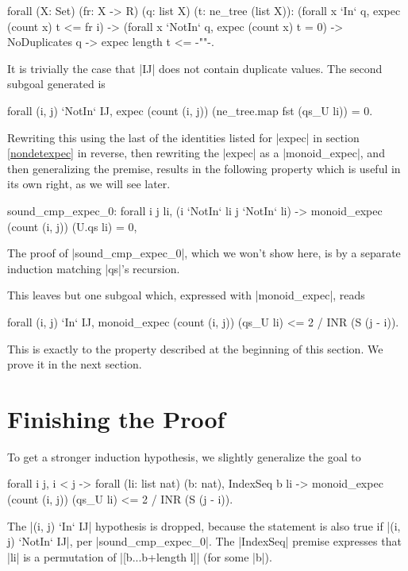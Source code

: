 \documentclass[runningheads]{llncs}
\begin{document}
\parbox{\textwidth}{\begin{code}
  forall (X: Set) (fr: X -> R) (q: list X) (t: ne_tree (list X)):
    (forall x `In` q, expec (count x) t <= fr i) ->
    (forall x `NotIn` q, expec (count x) t = 0) ->
    NoDuplicates q -> expec length t <= {-""-}.
\end{code}}
It is trivially the case that |IJ| does not contain duplicate values. The second subgoal generated is\begin{code}forall (i, j) `NotIn` IJ, expec (count (i, j)) (ne_tree.map fst (qs_U li)) = 0.\end{code} Rewriting this using  the last of the identities listed for |expec| in section \ref{nondetexpec} in reverse, then rewriting the |expec| as a |monoid_expec|, and then generalizing the premise, results in the following property which is useful in its own right, as we will see later.
\begin{code}sound_cmp_expec_0: forall i j li, (i `NotIn` li \/ j `NotIn` li) ->
  monoid_expec (count (i, j)) (U.qs li) = 0,\end{code}
The proof of |sound_cmp_expec_0|, which we won't show here, is by a separate induction matching |qs|'s recursion.

This leaves but one subgoal which, expressed with |monoid_expec|, reads
\begin{code}
  forall (i, j) `In` IJ, monoid_expec (count (i, j)) (qs_U li) <= 2 / INR (S (j - i)).
\end{code}
This is exactly  to the property described at the beginning of this section. We prove it in the next section.

\section{Finishing the Proof}
\label{finishing}

To get a stronger induction hypothesis, we slightly generalize the goal to
\begin{code}
  forall i j, i < j -> forall (li: list nat) (b: nat), IndexSeq b li ->
    monoid_expec (count (i, j)) (qs_U li) <= 2 / INR (S (j - i)).
\end{code}
The |(i, j) `In` IJ| hypothesis is dropped, because the statement is also true if |(i, j) `NotIn` IJ|, per |sound_cmp_expec_0|. The |IndexSeq| premise expresses that |li| is a permutation of |[b...b+length l]| (for some |b|).
\end{document}
